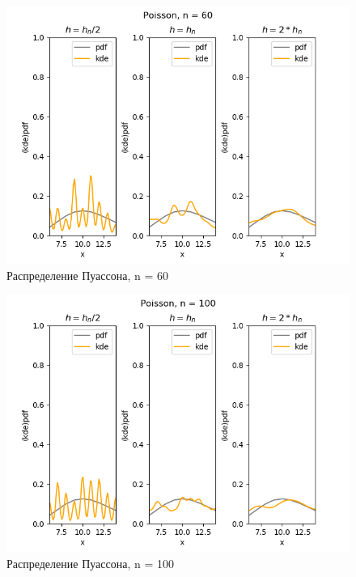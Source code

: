 \documentclass[../body.tex]{subfiles}
\begin{document}
\begin{figure}[H]
	\centering
	\includegraphics[width=\textwidth, height =0.4\textheight]{img/PoissonKDE n = 60.png}
	\caption{Распределение Пуассона, n = 60}
	\label{fig:poisson_kde_60}
\end{figure}

\begin{figure}[H]
	\centering
	\includegraphics[width=\textwidth, height =0.4\textheight]{img/PoissonKDE n = 100.png}
	\caption{Распределение Пуассона, n = 100}
	\label{fig:poisson_kde_100}
\end{figure}
\end{document}

